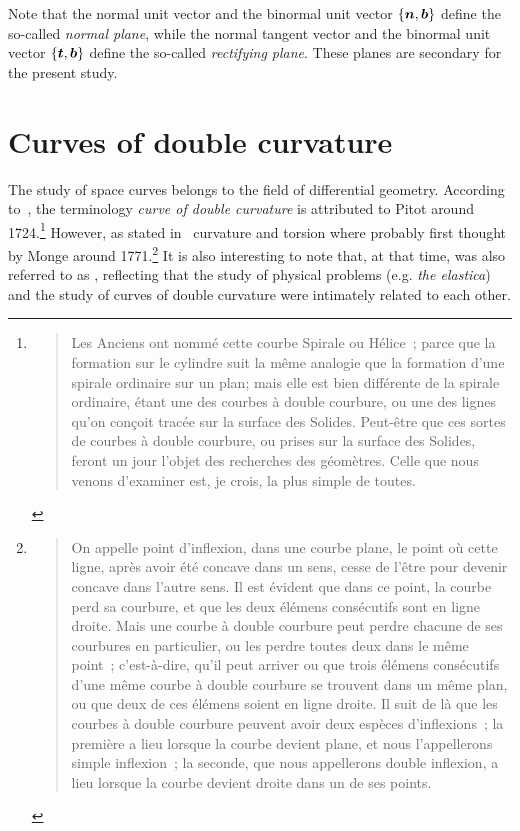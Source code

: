 Note that the normal unit vector and the binormal unit vector $\{\boldsymbol{n},\boldsymbol{b}\}$ define the so-called \emph{normal plane}, while the normal tangent vector and the binormal unit vector $\{\boldsymbol{t},\boldsymbol{b}\}$ define the so-called \emph{rectifying plane}. These planes are secondary for the present study.


\section{Curves of double curvature}\label{sec:curves_of_dc}

The study of space curves belongs to the field of differential geometry. According to~\cite[p.28]{Delcourt2007}, the terminology \emph{curve of double curvature} is attributed to Pitot around 1724.\footnote{\blockcquote[p.28]{Pitot1726}{Les Anciens ont nommé cette courbe Spirale ou Hélice~; parce que la formation sur le cylindre suit la même analogie que la formation d’une spirale ordinaire sur un plan; mais elle est bien différente de la spirale ordinaire, étant une des courbes à double courbure, ou une des lignes qu’on conçoit tracée sur la surface des Solides. Peut-être que ces sortes de courbes à double courbure, ou prises sur la surface des Solides, feront un jour l’objet des recherches des géomètres. Celle que nous venons d’examiner est, je crois, la plus simple de toutes.
}} However, as stated in~\cite[p.321]{Coolidge2013} curvature and torsion where probably first thought by Monge around 1771.\footnote{\blockcquote[p.363]{Monge1809}{On appelle point d'inflexion, dans une courbe plane, le point où cette ligne, après avoir été concave dans un sens, cesse de l'être pour devenir concave dans l'autre sens. Il est évident que dans ce point, la courbe perd sa courbure, et que les deux élémens consécutifs sont en ligne droite. Mais une courbe à double courbure peut perdre chacune de ses courbures en particulier, ou les perdre toutes deux dans le même point~; c'est-à-dire, qu'il peut arriver ou que trois élémens consécutifs d'une même courbe à double courbure se trouvent dans un même plan, ou que deux de ces élémens soient en ligne droite. Il suit de là que les courbes à double courbure peuvent avoir deux espèces d'inflexions~; la première a lieu lorsque la courbe devient plane, et nous l'appellerons simple inflexion~; la seconde, que nous appellerons double inflexion, a lieu lorsque la courbe devient droite dans un de ses points.}.} It is also interesting to note that, at that time,  was also referred to as , reflecting that the study of physical problems (e.g. \emph{the elastica}) and the study of curves of double curvature were intimately related to each other.

